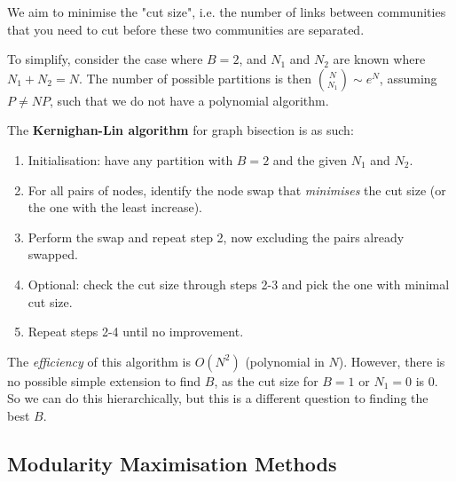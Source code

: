 \documentclass[12pt]{article}
\theoremstyle{definition}
\begin{document}
We aim to minimise the "cut size", i.e. the number of links between communities that you need to cut before these two communities are separated.

To simplify, consider the case where $B=2$, and $N_1$ and $N_2$ are known where $N_1+N_2=N$. The number of possible partitions is then $\binom{N}{N_1}\sim e^N$, assuming $P\neq NP$, such that we do not have a polynomial algorithm. 

The \textbf{Kernighan-Lin algorithm} for graph bisection is as such: 
\begin{enumerate}
    \item Initialisation: have any partition with $B=2$ and the given $N_1$ and $N_2$. 
    \item For all pairs of nodes, identify the node swap that \textit{minimises} the cut size (or the one with the least increase). 
    \item Perform the swap and repeat step 2, now excluding the pairs already swapped. 
    \item Optional: check the cut size through steps 2-3 and pick the one with minimal cut size. 
    \item Repeat steps 2-4 until no improvement. 
\end{enumerate}
The \textit{efficiency} of this algorithm is $O(N^2)$ (polynomial in $N$). However, there is no possible simple extension to find $B$, as the cut size for $B=1$ or $N_1=0$ is $0$. So we can do this hierarchically, but this is a different question to finding the best $B$.

\subsection{Modularity Maximisation Methods}
\end{document}
